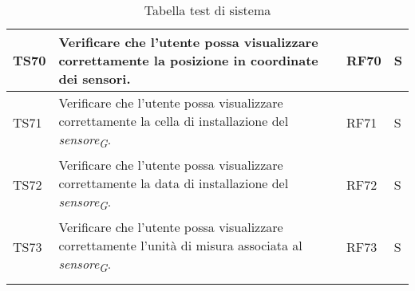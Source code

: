 \begin{longtable}{|C{1.9cm}|L{5cm}|C{2cm}|C{2cm}|}
    TS70 & Verificare che l'utente possa visualizzare correttamente la posizione in coordinate dei sensori. & RF70 & S \\
    \hline

    TS71 & Verificare che l'utente possa visualizzare correttamente la cella di installazione del \textit{sensore}\textsubscript{\textit{G}}. & RF71 & S \\
    \hline

    TS72 & Verificare che l'utente possa visualizzare correttamente la data di installazione del \textit{sensore}\textsubscript{\textit{G}}. & RF72 & S \\
    \hline

    TS73 & Verificare che l'utente possa visualizzare correttamente l'unità di misura associata al \textit{sensore}\textsubscript{\textit{G}}. & RF73 & S \\
    \hline

    \caption{Tabella test di sistema}
\end{longtable}

\pagebreak